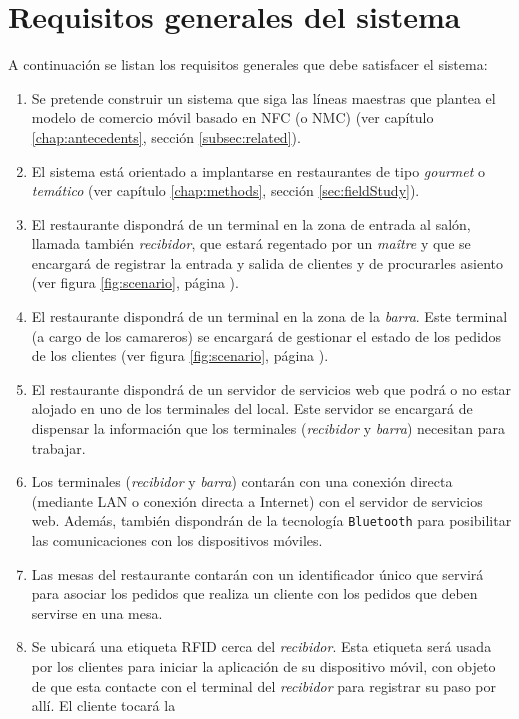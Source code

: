 \section{Requisitos generales del sistema}
A continuación se listan los requisitos generales que debe satisfacer el
sistema:
\begin{enumerate}
\item Se pretende construir un sistema que siga las líneas maestras que
plantea el modelo de comercio móvil basado en \acs{NFC} (o \acs{NMC}) (ver
capítulo \ref{chap:antecedents}, sección \ref{subsec:related}).
\item El sistema está orientado a implantarse en restaurantes de tipo
\emph{gourmet} o \emph{temático} (ver capítulo \ref{chap:methods}, sección 
\ref{sec:fieldStudy}).
\item El restaurante dispondrá de un terminal en la zona de entrada al salón,
llamada también \emph{recibidor}, que estará regentado por un \emph{maître} y
que se encargará de registrar la entrada y salida de clientes y de procurarles
asiento (ver figura \ref{fig:scenario}, página \pageref{fig:scenario}).
\item El restaurante dispondrá de un terminal en la zona de la \emph{barra}.
Este terminal (a cargo de los camareros) se encargará de gestionar el estado de
los pedidos de los clientes (ver figura \ref{fig:scenario}, página
\pageref{fig:scenario}).
\item El restaurante dispondrá de un servidor de servicios web que podrá o no
estar alojado en uno de los terminales del local. Este servidor se encargará
de dispensar la información que los terminales (\emph{recibidor} y
\emph{barra}) necesitan para trabajar.
\item Los terminales (\emph{recibidor} y \emph{barra}) contarán con una 
conexión directa (mediante \acs{LAN} o conexión directa a Internet) con el
servidor de servicios web. Además, también dispondrán de la tecnología
\texttt{Bluetooth} para posibilitar las comunicaciones con los dispositivos 
móviles.
\item Las mesas del restaurante contarán con un identificador único que
servirá para asociar los pedidos que realiza un cliente con los pedidos que
deben servirse en una mesa.
\item Se ubicará una etiqueta \acs{RFID} cerca del \emph{recibidor}. Esta
etiqueta será usada por los clientes para iniciar la aplicación de su
dispositivo móvil, con objeto de que esta contacte con el terminal del
\emph{recibidor} para registrar su paso por allí. El cliente tocará la

\end{enumerate}
